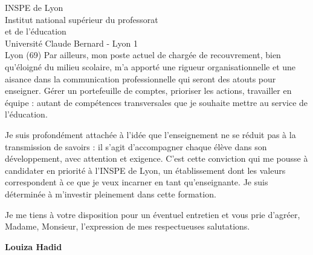 \documentclass[12pt,a4paper]{letter}
\begin{document}
\begin{letter}{INSPE de Lyon\\
Institut national supérieur du professorat\\
et de l'éducation\\
Université Claude Bernard - Lyon 1\\
Lyon (69)}
\hspace{1cm} Par ailleurs, mon poste actuel de chargée de recouvrement, bien qu'éloigné du milieu scolaire, m'a apporté une rigueur organisationnelle et une aisance dans la communication professionnelle qui seront des atouts pour enseigner. Gérer un portefeuille de comptes, prioriser les actions, travailler en équipe : autant de compétences transversales que je souhaite mettre au service de l'éducation.

\hspace{1cm} Je suis profondément attachée à l'idée que l'enseignement ne se réduit pas à la transmission de savoirs : il s'agit d'accompagner chaque élève dans son développement, avec attention et exigence. C'est cette conviction qui me pousse à candidater en priorité à l'INSPE de Lyon, un établissement dont les valeurs correspondent à ce que je veux incarner en tant qu'enseignante. Je suis déterminée à m'investir pleinement dans cette formation.

\closing{Je me tiens à votre disposition pour un éventuel entretien et vous prie d'agréer, Madame, Monsieur, l'expression de mes respectueuses salutations.}

\vspace{0.5cm}
\hfill \textbf{Louiza Hadid}

\end{letter}
\end{document}
